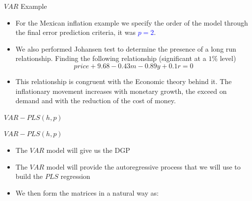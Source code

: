 \documentclass{beamer}
\newcommand{\?}{?`}
\begin{document}
\begin{frame}{$VAR$ Example}
  \begin{itemize}
  \item For the Mexican inflation example we specify the order of the model through the final error prediction criteria,
  it was \textcolor{blue}{$p=2$}.
  \item We also performed  Johansen test to determine the presence of a long run relationship.
  Finding the following relationship (significant at a $1\%$ level)
      \begin{displaymath}
      price+9.68-0.43m-0.89y+0.1r=0
    \end{displaymath}
  \item This relationship is congruent with the Economic theory behind it.
  The inflationary movement increases with monetary growth, the exceed on demand and with the reduction of the cost of money.

  \end{itemize}
\end{frame}




\begin{frame}{}
  \begin{block}{}
    \begin{center}
      \vspace{3mm}
      {\Large $VAR-PLS(h,p)$}
      \vspace{3mm}
    \end{center}
  \end{block}
\end{frame}


\begin{frame}{$VAR-PLS(h,p)$}
  \begin{itemize}
  \item The $VAR$ model will give us the DGP
  \bigskip
  \item The $VAR$ model will provide the autoregressive process that we will use to build the $PLS$ regression
  \bigskip
  \item We then form the matrices in a natural way as:
  \end{itemize}
\end{frame}
\end{document}
